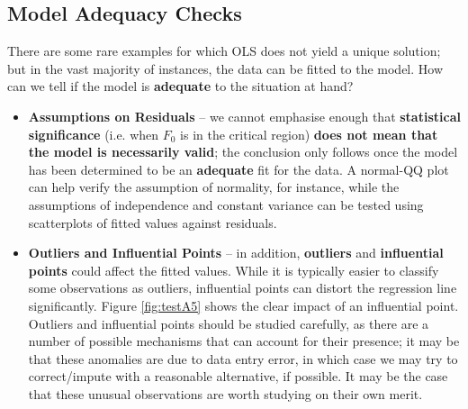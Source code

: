 \subsection{Model Adequacy Checks} There are some rare examples for which OLS does not yield a unique solution; but in the vast majority of instances, the data can be fitted to the model. How can we tell if the model is \textbf{adequate} to the situation at hand? 
\begin{itemize}
\item \textbf{Assumptions on Residuals} -- we cannot emphasise enough that \textbf{statistical significance} (i.e. when $F_0$ is in the critical region) \textbf{does not mean that the model is necessarily valid}; the conclusion only follows once the model has been determined to be an \textbf{adequate} fit for the data. A normal-QQ plot can help verify the assumption of normality, for instance, while the assumptions of independence and constant variance can be tested using scatterplots of fitted values against residuals.

\item \textbf{Outliers and Influential Points} -- in addition, \textbf{outliers} and \textbf{influential points} could affect the fitted values. While it is typically easier to classify some observations as outliers, influential points can distort the regression line significantly. Figure \ref{fig:testA5} shows the clear impact of an influential point. Outliers and influential points should be studied carefully, as there are a number of possible mechanisms that can account for their presence; it may be that these anomalies are due to data entry error, in which case we may try to correct/impute with a reasonable alternative, if possible. It may be the case that these unusual observations are worth studying on their own merit.


\end{itemize}
